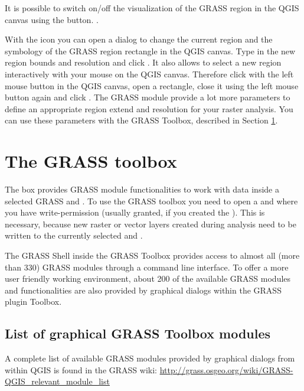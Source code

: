 It is possible to switch on/off the visualization of the GRASS region in the
QGIS canvas using the 
button. .

With the  icon you
can open a dialog to change the current region and the symbology of the GRASS
region rectangle in the QGIS canvas. Type in the new region bounds and
resolution and click . It also allows to select a new region
interactively with your mouse on the QGIS canvas. Therefore click with the
left mouse button in the QGIS canvas, open a rectangle, close it using the
left mouse button again and click .
The GRASS module  provide a lot more parameters to define
an appropriate region extend and resolution for your raster analysis. You can
use these parameters with the GRASS Toolbox, described in Section
\ref{subsec:grass_toolbox}.

\section{The GRASS toolbox}\label{subsec:grass_toolbox}

The  box provides GRASS module
functionalities to work with data inside a selected GRASS 
and . To use the GRASS toolbox you need to open a
 and  where you have write-permission
(usually granted, if you created the ). This is necessary,
because new raster or vector layers created during analysis need to be written
to the currently selected  and .

The GRASS Shell inside the GRASS Toolbox provides access to almost all (more
than 330) GRASS modules through a command line interface. To offer a more user
friendly working environment, about 200 of the available GRASS modules and
functionalities are also provided by graphical dialogs within the GRASS plugin Toolbox.

\subsection{List of graphical GRASS Toolbox modules}

A complete list of available GRASS modules provided by graphical dialogs from 
within QGIS is found in the GRASS wiki: \url{http://grass.osgeo.org/wiki/GRASS-QGIS_relevant_module_list}

